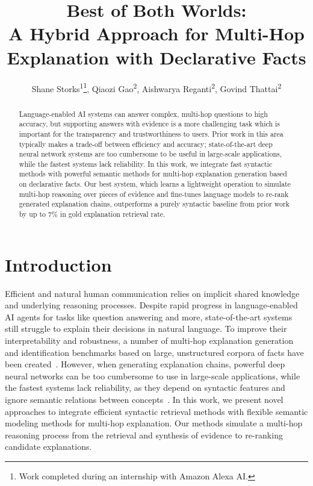 \documentclass[letterpaper]{article} %
\title{Best of Both Worlds:\\A Hybrid Approach for Multi-Hop Explanation with Declarative Facts}
\author{
    Shane Storks\textsuperscript{\rm 1}\thanks{Work completed during an internship with Amazon Alexa AI.},
    Qiaozi Gao\textsuperscript{\rm 2},
    Aishwarya Reganti\textsuperscript{\rm 2},
    Govind Thattai\textsuperscript{\rm 2}
}
\begin{document}
\maketitle

\begin{abstract}
Language-enabled AI systems can answer complex, multi-hop questions to high accuracy, but supporting answers with evidence is a more challenging task which is important for the transparency and trustworthiness to users. Prior work in this area typically makes a trade-off between efficiency and accuracy; state-of-the-art deep neural network systems are too cumbersome to be useful in large-scale applications, while the fastest systems lack reliability. In this work, we integrate fast syntactic methods with powerful semantic methods for multi-hop explanation generation based on declarative facts. Our best system, which learns a lightweight operation to simulate multi-hop reasoning over pieces of evidence and fine-tunes language models to re-rank generated explanation chains, outperforms a purely syntactic baseline from prior work by up to 7\% in gold explanation retrieval rate.
\end{abstract}


\section{Introduction}

Efficient and natural human communication relies on implicit shared knowledge and underlying reasoning processes. Despite rapid progress in language-enabled AI agents for tasks like question answering and more, state-of-the-art systems still struggle to explain their decisions in natural language. To improve their interpretability and robustness, a number of multi-hop explanation generation and identification benchmarks based on large, unstructured corpora of facts have been created~\cite{mihaylov2018can,khot2020qasc,jhamtani-clark-2020-learning}. However, when generating explanation chains, powerful deep neural networks can be too cumbersome to use in large-scale applications, while the fastest systems lack reliability, as they depend on syntactic features and ignore semantic relations between concepts~\cite{banerjee2020knowledge,jhamtani-clark-2020-learning}. In this work, we present novel approaches to integrate efficient syntactic retrieval methods with flexible semantic modeling methods for multi-hop explanation.
Our methods simulate a multi-hop reasoning process from the retrieval and synthesis of evidence to re-ranking candidate explanations.
\end{document}
